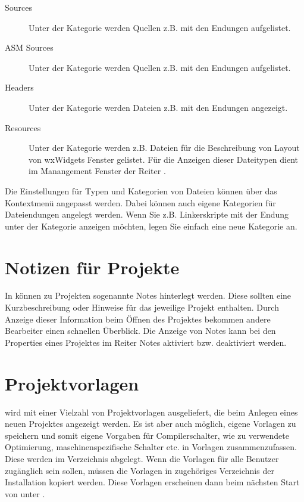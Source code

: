\begin{description}
\item[Sources] Unter der Kategorie  werden Quellen z.B. mit den Endungen  aufgelistet.
\item[ASM Sources] Unter der Kategorie  werden Quellen z.B. mit den Endungen  aufgelistet.
\item[Headers] Unter der Kategorie  werden Dateien z.B. mit den Endungen  angezeigt.
\item[Resources] Unter der Kategorie  werden z.B. Dateien  für die Beschreibung von Layout von wxWidgets Fenster gelistet. Für die Anzeigen dieser Dateitypen dient im Manangement Fenster der Reiter .
\end{description}

Die Einstellungen für Typen und Kategorien von Dateien können über das Kontextmenü  angepasst werden. Dabei können auch eigene Kategorien für Dateiendungen angelegt werden. Wenn Sie z.B. Linkerskripte mit der Endung  unter der Kategorie  anzeigen möchten, legen Sie einfach eine neue Kategorie an.


\section{Notizen für Projekte}

In \codeblocks können zu Projekten sogenannte Notes hinterlegt werden. Diese sollten eine Kurzbeschreibung oder Hinweise für das jeweilige Projekt enthalten. Durch Anzeige dieser Information beim Öffnen des Projektes bekommen andere Bearbeiter einen schnellen Überblick. Die Anzeige von Notes kann bei den Properties eines Projektes im Reiter Notes aktiviert bzw. deaktiviert werden.

\section{Projektvorlagen}

\codeblocks wird mit einer Vielzahl von Projektvorlagen ausgeliefert, die beim Anlegen eines neuen Projektes angezeigt werden. Es ist aber auch möglich, eigene Vorlagen zu speichern und somit eigene Vorgaben für Compilerschalter, wie zu verwendete Optimierung, maschinenspezifische Schalter etc. in Vorlagen zusammenzufassen. Diese werden im Verzeichnis  abgelegt. Wenn die Vorlagen für alle Benutzer zugänglich sein sollen, müssen die Vorlagen in zugehöriges Verzeichnis der \codeblocks Installation kopiert werden. Diese Vorlagen erscheinen dann beim nächsten Start von \codeblocks unter .

